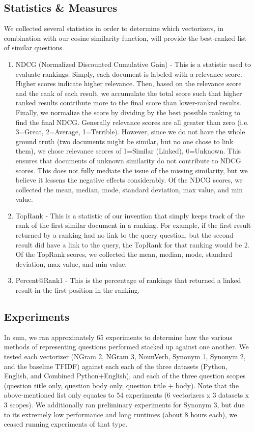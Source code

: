 \documentclass{acm_proc_article-sp}
\begin{document}
\subsection{Statistics \& Measures}
We collected several statistics in order to determine which vectorizers, in combination with our cosine similarity function, will provide the best-ranked list of similar questions. 
\begin{enumerate}[noitemsep]
	\item NDCG (Normalized Discounted Cumulative Gain) - This is a statistic used to evaluate rankings. Simply, each document is labeled with a relevance score. Higher scores indicate higher relevance. Then, based on the relevance score and the rank of each result, we accumulate the total score such that higher ranked results contribute more to the final score than lower-ranked results. Finally, we normalize the score by dividing by the best possible ranking to find the final NDCG. 
Generally relevance scores are all greater than zero (i.e. 3=Great, 2=Average, 1=Terrible). However, since we do not have the whole ground truth (two documents might be similar, but no one chose to link them), we chose relevance scores of 1=Similar (Linked), 0=Unknown. This ensures that documents of unknown similarity do not contribute to NDCG scores. This does not fully mediate the issue of the missing similarity, but we believe it lessens the negative effects considerably.
Of the NDCG scores, we collected the mean, median, mode, standard deviation, max value, and min value.
	\item TopRank - This is a statistic of our invention that simply keeps track of the rank of the first similar document in a ranking. For example, if the first result returned by a ranking had no link to the query question, but the second result did have a link to the query, the TopRank for that ranking would be 2. Of the TopRank scores, we collected the mean, median, mode, standard deviation, max value, and min value.
	\item Percent@Rank1 - This is the percentage of rankings that returned a linked result in the first position in the ranking.
\end{enumerate}

\subsection{Experiments}
In sum, we ran approximately 65 experiments to determine how the various methods of representing questions performed stacked up against one another. We tested each vectorizer (NGram 2, NGram 3, NounVerb, Synonym 1, Synonym 2, and the baseline TFIDF) against each each of the three datasets (Python, English, and Combined Python+English), and each of the three question scopes (question title only, question body only, question title + body). 
Note that the above-mentioned list only equates to 54 experiments (6 vectorizers x 3 datasets x 3 scopes). We additionally ran preliminary experiments for Synonym 3, but due to its extremely low performance and long runtimes (about 8 hours each), we ceased running experiments of that type.
\end{document}
